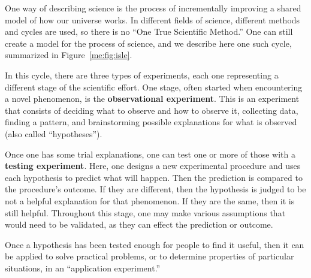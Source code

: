 One way of describing science is the process of incrementally improving a shared model of how our universe works. In different fields of science, different methods and cycles are used, so there is no ``One True Scientific Method.'' One can still create a model for the process of science, and we describe here one such cycle, summarized in Figure~\ref{me:fig:isle}.

In this cycle, there are three types of experiments, each one representing a different stage of the scientific effort. One stage, often started when encountering a novel phenomenon, is the \textbf{observational experiment}. This is an experiment that consists of deciding what to observe and how to observe it, collecting data, finding a pattern, and brainstorming possible explanations for what is observed (also called ``hypotheses'').

Once one has some trial explanations, one can test one or more of those with a \textbf{testing experiment}. Here, one designs a new experimental procedure and uses each hypothesis to predict what will happen. Then the prediction is compared to the procedure's outcome. If they are different, then the hypothesis is judged to be not a helpful explanation for that phenomenon. If they are the same, then it is still helpful. Throughout this stage, one may make various assumptions that would need to be validated, as they can effect the prediction or outcome.

Once a hypothesis has been tested enough for people to find it useful, then it can be applied to solve practical problems, or to determine properties of particular situations, in an ``application experiment.''



